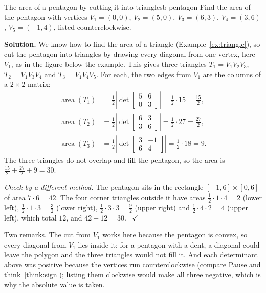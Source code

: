\documentclass[11pt]{article}
\begin{document}
\begin{exmp}{The area of a pentagon by cutting it into triangles}{b-pentagon}
Find the area of the pentagon with vertices $V_1=(0,0)$, $V_2=(5,0)$, $V_3=(6,3)$, $V_4=(3,6)$, $V_5=(-1,4)$, listed counterclockwise.

\textbf{Solution.} We know how to find the area of a triangle (Example~\ref{ex:triangle}), so cut the pentagon into triangles by drawing every diagonal from one vertex, here $V_1$, as in the figure below the example. This gives three triangles $T_1=V_1V_2V_3$, \ $T_2=V_1V_3V_4$ and $T_3=V_1V_4V_5$. For each, the two edges from $V_1$ are the columns of a $2\times2$ matrix:
\begin{align*}
\operatorname{area}(T_1)&=\tfrac12\left|\det\begin{bmatrix}5&6\\0&3\end{bmatrix}\right|=\tfrac12\cdot15=\tfrac{15}2,\\
\operatorname{area}(T_2)&=\tfrac12\left|\det\begin{bmatrix}6&3\\3&6\end{bmatrix}\right|=\tfrac12\cdot27=\tfrac{27}2,\\
\operatorname{area}(T_3)&=\tfrac12\left|\det\begin{bmatrix}3&-1\\6&4\end{bmatrix}\right|=\tfrac12\cdot18=9.
\end{align*}
The three triangles do not overlap and fill the pentagon, so the area is $\tfrac{15}2+\tfrac{27}2+9=30$.

\emph{Check by a different method.} The pentagon sits in the rectangle $[-1,6]\times[0,6]$ of area $7\cdot6=42$. The four corner triangles outside it have areas $\tfrac12\cdot1\cdot4=2$ (lower left), $\tfrac12\cdot1\cdot3=\tfrac32$ (lower right), $\tfrac12\cdot3\cdot3=\tfrac92$ (upper right) and $\tfrac12\cdot4\cdot2=4$ (upper left), which total $12$, and $42-12=30$. \ $\checkmark$

Two remarks. The cut from $V_1$ works here because the pentagon is convex, so every diagonal from $V_1$ lies inside it; for a pentagon with a dent, a diagonal could leave the polygon and the three triangles would not fill it. And each determinant above was positive because the vertices run counterclockwise (compare Pause and think~\ref{think:sign}); listing them clockwise would make all three negative, which is why the absolute value is taken.
\end{exmp}
\end{document}
